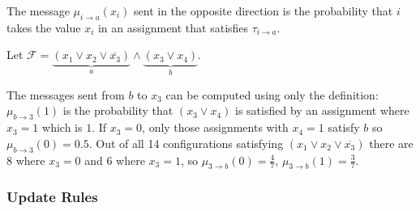 The message $\mu_{i \rightarrow a}(x_i)$ sent in the opposite direction is the probability that $i$ takes the value $x_i$ in an assignment that satisfies $\tau_{i \rightarrow a}$.

\begin{example}
Let $\mathcal{F} = \underbrace{(x_1 \lor x_2 \lor \overline{x_3})}_a  \land \underbrace{(x_3 \lor x_4)}_b $.
\end{example}
\begin{figure}[h]
\centering

\end{figure}
The messages sent from $b$ to $x_3$ can be computed using only the definition: \newline
$\mu_{b \rightarrow 3}(1)$ is the probability that $(x_3 \lor x_4)$ is satisfied by an assignment where $x_3 = 1$ which is $1$. If $x_3 = 0$, only those assignments with $x_4 = 1$ satisfy $b$ so $\mu_{b \rightarrow 3}(0) = 0.5$. \newline
Out of all 14 configurations satisfying $(x_1 \lor x_2 \lor \overline{x_3})$ there are $8$ where $x_3 = 0$ and $6$ where $x_3 = 1$, so $\mu_{3 \rightarrow b}(0) = \frac{4}{7}, \, \mu_{3 \rightarrow b}(1) = \frac{3}{7}$. 

\subsubsection{Update Rules}



